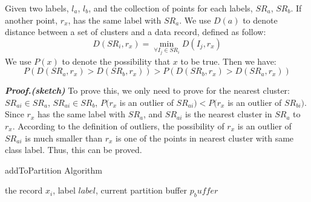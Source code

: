 \documentclass[runningheads]{llncs}
\begin{document}
	\begin{lemma} \label{lemma}
		Given two labels, $l_a$, $l_b$, and the collection of points for each labels, $SR_a$, $SR_b$. If another point, $r_x$, has the same label with $SR_a$. We use $D(a)$ to denote distance between a set of clusters and a data record, defined as follow:
		\begin{displaymath}
		D(SR_i, r_x) = \min_{\forall I_j \in SR_i} D(I_j, r_x) 
		\end{displaymath}
		We use $P(x)$ to denote the possibility that $x$ to be true. Then we have:
		\begin{displaymath}
		P(D(SR_a, r_x) > D(SR_b, r_x)) > P(D(SR_b, r_x) > D(SR_a, r_x))
		\end{displaymath}
	\end{lemma}
	
	\textbf{\textit{Proof.(sketch)}} 
	To prove this, we only need to prove for the nearest cluster: $SR_{ai} \in SR_a$, $SR_{ai} \in SR_b$, $P(r_x$ is an outlier of $SR_{ai}) < P(r_x$ is an outlier of $SR_{bi})$. Since $r_x$ has the same label with $SR_a$, and $SR_{ai}$ is the nearest cluster in $SR_a$ to $r_x$. According to the definition of outliers, the possibility of $r_x$ is an outlier of $SR_{ai}$ is much smaller than $r_x$ is one of the points in nearest cluster with same class label. Thus, this can be proved.
	
	\begin{algorithm}
		\caption{addToPartition Algorithm} \label{algorithm:clustering}
		\begin{algorithmic}
			\REQUIRE the record $x_i$, label $label$, current partition buffer $p_buffer$
			\ELSE 
			\ENDFOR
			\ENDIF
		\end{algorithmic}
	\end{algorithm}
	
\end{document}
